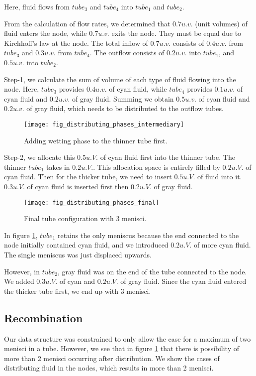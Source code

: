 	Here, fluid flows from ${tube}_3$ and ${tube}_4$ into ${tube}_1$ and ${tube}_2$. 

	From the calculation of flow rates, we determined that $0.7 u.v.$ (unit volumes) of fluid enters the node, while $0.7 u.v.$ exits the node. They must be equal due to Kirchhoff's law at the node. The total inflow of $0.7 u.v.$ consists of $0.4 u.v.$ from ${tube}_3$ and $0.3 u.v.$ from ${tube}_4$. The outflow consists of $0.2 u.v.$ into ${tube}_1$, and $0.5 u.v.$ into ${tube}_2$.
	
	Step-1, we calculate the sum of volume of each type of fluid flowing into the node. Here, ${tube}_3$ provides $0.4 u.v.$ of cyan fluid, while ${tube}_4$ provides $0.1 u.v.$ of cyan fluid and $0.2 u.v.$ of gray fluid. Summing we obtain $0.5 u.v.$ of cyan fluid and $0.2 u.v.$ of gray fluid, which needs to be distributed to the outflow tubes.
	
	\begin{figure}[H]
		\centering
		\texttt{[image: fig\_distributing\_phases\_intermediary]}
		\caption{Adding wetting phase to the thinner tube first.}
	\end{figure}
	
	Step-2, we allocate this $0.5 u.V.$ of cyan fluid first into the thinner tube. The thinner ${tube}_1$ takes in $0.2 u.V.$. This allocation space is entirely filled by $0.2 u.V.$ of cyan fluid. Then for the thicker tube, we need to insert $0.5 u.V.$ of fluid into it. $0.3 u.V.$ of cyan fluid is inserted first then $0.2 u.V.$ of gray fluid.
	
	\begin{figure}[H]
		\centering
		\texttt{[image: fig\_distributing\_phases\_final]}
		\caption{Final tube configuration with 3 menisci.}
		\label{fig:distributing_phases_final}
	\end{figure}
	
	In figure \ref{fig:distributing_phases_final}, ${tube}_1$ retains the only meniscus because the end connected to the node initially contained cyan fluid, and we introduced $0.2 u.V.$ of more cyan fluid. The single meniscus was just displaced upwards.
	
	However, in ${tube}_2$, gray fluid was on the end of the tube connected to the node. We added $0.3 u.V.$ of cyan and $0.2 u.V.$ of gray fluid. Since the cyan fluid entered the thicker tube first, we end up with 3 menisci.	

\subsection{Recombination} \label{sec:recombination-details}
	Our data structure was constrained to only allow the case for a maximum of two menisci in a tube. However, we see that in figure \ref{fig:distributing_phases_final} that there is possibility of more than 2 menisci occurring after distribution. We show the cases of distributing fluid in the nodes, which results in more than 2 menisci.
	
